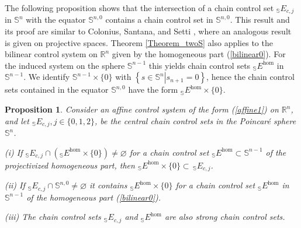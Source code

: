\documentclass[preprint,12pt]{elsarticle}
\newtheorem{proposition}{Proposition}
\begin{document}
The following proposition shows that the intersection of a chain control set
$_{\mathbb{S}}E_{c,j}$ in $\mathbb{S}^{n}$ with the equator $\mathbb{S}^{n,0}$
contains a chain control set in $\mathbb{S}^{n,0}$. This result and its proof
are similar to Colonius, Santana, and Setti \cite[Lemma 6.8]{ColSS23}, where
an analogous result is given on projective spaces. Theorem \ref{Theorem_twoS}
also applies to the bilinear control system on $\mathbb{R}^{n}$ given by the
homogeneous part (\ref{bilinear0}). For the induced system on the sphere
$\mathbb{S}^{n-1}$ this yields chain control sets $_{\mathbb{S}}E^{\hom}$ in
$\mathbb{S}^{n-1}$. We identify $\mathbb{S}^{n-1}\times\{0\}$ with $\left\{
s\in\mathbb{S}^{n}\left\vert s_{n+1}=0\right.  \right\}  $, hence the chain
control sets contained in the equator $\mathbb{S}^{n,0}$ have the form
$_{\mathbb{S}}E^{\hom}\times\{0\}$.

\begin{proposition}
\label{Proposition5.7}Consider an affine control system of the form
(\ref{affine1}) on $\mathbb{R}^{n}$, and let $_{\mathbb{S}}E_{c,j}%
,j\in\{0,1,2\}$, be the central chain control sets in the Poincar\'{e} sphere
$\mathbb{S}^{n}$.

(i) If $_{\mathbb{S}}E_{c,j}\cap\left(  _{\mathbb{S}}E^{\hom}\times
\{0\}\right)  \not =\varnothing$ for a chain control set $_{\mathbb{S}}%
E^{\hom}\subset\mathbb{S}^{n-1}$ of the projectivized homogeneous part, then
$_{\mathbb{S}}E^{\hom}\times\{0\}\subset\,_{\mathbb{S}}E_{c,j}$.

(ii) If $_{\mathbb{S}}E_{c,j}\cap\mathbb{S}^{n,0}\not =\varnothing$ it
contains $_{\mathbb{S}}E^{\hom}\times\{0\}$ for a chain control set
$_{\mathbb{S}}E^{\hom}$ in $\mathbb{S}^{n-1}$ of the homogeneous part
(\ref{bilinear0}).

(iii) The chain control sets $_{\mathbb{S}}E_{c,j}$ and $_{\mathbb{S}}E^{\hom
}$ are also strong chain control sets.
\end{proposition}
\end{document}
